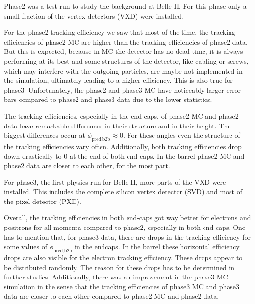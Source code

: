 \documentclass[a4paper,11pt,twosided,final,german,openbib,pdftex,listof=totoc,bibliography=totoc]{scrbook}
\begin{document}
Phase2 was a test run to study the background at Belle II. For this phase only a small fraction of the vertex detectors (VXD) were installed.

For the phase2 tracking efficiency we saw that most of the time, the tracking efficiencies of phase2 MC are higher than the tracking efficiencies of phase2 data. But this is expected, because in MC the detector has no dead time, it is always performing at its best and some structures of the detector, like cabling or screws, which may interfere with the outgoing particles, are maybe not implemented in the simulation, ultimately leading to a higher efficiency. This is also true for phase3. Unfortunately, the phase2 and phase3 MC have noticeably larger error bars compared to phase2 and phase3 data due to the lower statistics.
\newline

The tracking efficiencies, especially in the end-caps, of phase2 MC and phase2 data have remarkable differences in their structure and in their height. The biggest differences occur at $\phi_{\textrm{pred,b2b}} \approx 0$. For these angles even the structure of the tracking efficiencies vary often. Additionally, both tracking efficiencies drop down drastically to 0 at the end of both end-caps. In the barrel phase2 MC and phase2 data are closer to each other, for the most part.
\newline

For phase3, the first physics run for Belle II, more parts of the VXD were installed. This includes the complete silicon vertex detector (SVD) and most of the pixel detector (PXD). 

Overall, the tracking efficiencies in both end-caps got way better for electrons and positrons for all momenta compared to phase2, especially in both end-caps. One has to mention that, for phase3 data, there are drops in the tracking efficiency for some values of $\phi_{\textrm{pred,b2b}}$ in the endcaps.
In the barrel these horizontal efficiency drops are also visible for the electron tracking efficiency.
These drops appear to be distributed randomly. The reason for these drops has to be determined in further studies. Additionally, there was an improvement in the phase3 MC simulation in the sense that the tracking efficiencies of phase3 MC and phase3 data are closer to each other compared to phase2 MC and phase2 data.

 
 
\end{document}
